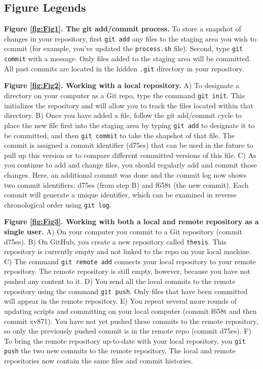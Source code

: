 \subsection{Figure Legends}

\textbf{Figure \ref{fig:Fig1}. The git add/commit process.}
To store a snapshot of changes in your repository, first \verb|git add| any files to the staging area you wish to commit (for example, you've updated the \verb|process.sh| file).
Second, type \verb|git commit| with a message. Only files added to the staging area will be committed.
All past commits are located in the hidden \verb|.git| directory in your repository.

\textbf{Figure \ref{fig:Fig2}. Working with a local repository.}
A) To designate a directory on your computer as a Git repo, type the command \verb|git init|. 
This initializes the repository and will allow you to track the files located within that directory.
B) Once you have added a file, follow the git add/commit cycle to place the new file first into the staging area by typing \verb|git add| to designate it to be committed, and then \verb|git commit| to take the shapshot of that file. 
The commit is assigned a commit identifier (d75es) that can be used in the future to pull up this version or to compare different committed versions of this file.
C) As you continue to add and change files, you should regularly add and commit those changes. 
Here, an additional commit was done and the commit log now shows two commit identifiers: d75es (from step B) and f658t (the new commit).
Each commit will generate a unique identifier, which can be examined in reverse chronological order using \verb|git log|. 

\textbf{Figure \ref{fig:Fig3}. Working with both a local and remote repository as a single user.}
A) On your computer you commit to a Git repository (commit d75es).
B) On GitHub, you create a new repository called \verb|thesis|.
This repository is currently empty and not linked to the repo on your local machine.
C) The command \verb|git remote add| connects your local repository to your remote repository.
The remote repository is still empty, however, because you have not pushed any content to it.
D) You send all the local commits to the remote repository using the command \verb|git push|.
Only files that have been committed will appear in the remote repository.
E) You repeat several more rounds of updating scripts and committing on your local computer (commit f658t and then commit xv871).
You have not yet pushed these commits to the remote repository, so only the previously pushed commit is in the remote repo (commit d75es).
F) To bring the remote repository up-to-date with your local repository, you \verb|git push| the two new commits to the remote repository.
The local and remote repositories now contain the same files and commit histories.

